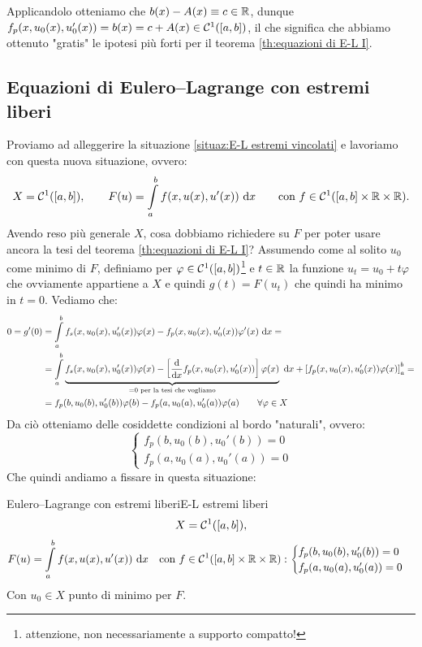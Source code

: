 \documentclass[openany]{book}
\newcommand\di{\text{d}}
\begin{document}
Applicandolo otteniamo che $b(x)-A(x) \equiv c \in \mathbb{R}$, dunque $f_p(x, u_0(x), u_0'(x)) = b(x) = c+A(x) \in \mathcal{C}^1([a,b])$, il che significa che abbiamo ottenuto "gratis" le ipotesi più forti per il teorema \ref{th:equazioni di E-L I}.


\subsection{Equazioni di Eulero--Lagrange con estremi liberi}

Proviamo ad alleggerire la situazione \ref{situaz:E-L estremi vincolati} e lavoriamo con questa nuova situazione, ovvero:
\[X = \mc{C}^1([a,b]), \qquad F(u) = \intop_a^b f(x,u(x),u'(x))\de x \qquad \text{con } f \in \mc{C}^1([a,b]\times\R\times\R) .\]
Avendo reso più generale $X$, cosa dobbiamo richiedere su $F$ per poter usare ancora la tesi del teorema \ref{th:equazioni di E-L I}?
Assumendo come al solito $u_0$ come minimo di $F$, definiamo per $\varphi \in \mathcal{C}^1([a,b])$\footnote{attenzione, non necessariamente a supporto compatto!} e $t \in\mathbb{R}$ la funzione $u_t = u_0 + t\varphi$ che ovviamente appartiene a $X$ e quindi $g(t) = F(u_t)$ che quindi ha minimo in $t=0$. Vediamo che:
\[\begin{aligned}
 0 = g'(0) & = \intop_a^b f_s(x, u_0(x), u_0'(x))\varphi(x) - f_p(x,u_0(x),u_0'(x))\varphi'(x)\de x = \\
 & = \intop_a^b \underbrace{f_s(x, u_0(x), u_0'(x))\varphi(x) - \left[\frac{\di}{\di x}f_p(x,u_0(x),u_0'(x))\right]\varphi(x)}_{=0\text{ per la tesi che vogliamo}} \de x + \left[ f_p(x,u_0(x),u_0'(x))\varphi(x) \right]_a^b = \\
 & = f_p(b,u_0(b), u_0'(b))\varphi(b) - f_p(a,u_0(a), u_0'(a))\varphi(a)\qquad \forall \varphi \in X
\end{aligned}\]
Da ciò otteniamo delle cosiddette condizioni al bordo "naturali", ovvero:
\[ \begin{cases}
    f_p(b,u_0(b), u_0'(b))=0\\ f_p(a,u_0(a), u_0'(a)) = 0
\end{cases}\]
Che quindi andiamo a fissare in questa situazione:

\begin{situation}{Eulero--Lagrange con estremi liberi}{E-L estremi liberi}
    \[ X = \mathcal{C}^1([a,b]),\]
    \[ F(u) = \intop_a^b f(x,u(x),u'(x))\de x \quad \text{con } f \in \mc{C}^1([a,b]\times\R\times\R) : \begin{cases}
        f_p(b,u_0(b), u_0'(b))=0\\ f_p(a,u_0(a), u_0'(a)) = 0
    \end{cases} \]
    Con $u_0 \in X$ punto di minimo per $F$.
\end{situation}
\end{document}
